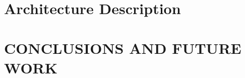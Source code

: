 




\section{Architecture Description}
\label{sect:Architecture}


\addtolength{\textheight}{-15cm}   %


\section{CONCLUSIONS AND FUTURE WORK}
\label{sect:Conclusions}





